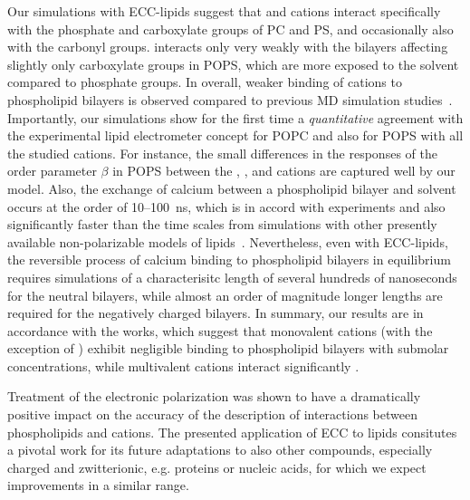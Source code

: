 Our simulations with ECC-lipids suggest that
 and  cations
interact specifically with the phosphate and carboxylate groups of PC and PS, 
and occasionally also with the carbonyl groups. 
 interacts only very weakly with the bilayers
affecting slightly only carboxylate groups in POPS,
which are more exposed to the solvent compared to phosphate groups. 
In overall, weaker binding of cations to phospholipid bilayers is observed 
compared to previous MD simulation studies~\citep{nmrlipids_proj4, catte16, bockmann03, bockmann04, melcrova16, javanainen17}. 
Importantly,
our simulations show for the first time a \emph{quantitative} agreement with the experimental lipid electrometer concept
for POPC and also for POPS with all the studied cations. 
For instance, the small differences 
in the responses of the order parameter $\beta$ in POPS
between the 
, , and  cations
are captured well by our model. 
Also, the exchange of calcium between a phospholipid bilayer and solvent 
occurs at the order of 10--100~ns, 
which is in accord with experiments and also 
significantly faster than the time scales from simulations 
with other presently available non-polarizable models of lipids~\citep{melcrova16, javanainen17, catte16}. 
Nevertheless, even with ECC-lipids,
the reversible process of calcium binding to phospholipid bilayers in equilibrium
requires simulations of a characterisitc length of several hundreds of nanoseconds 
for the neutral bilayers,
while almost an order of magnitude longer lengths 
are required for the negatively charged bilayers. 
In summary,
our results are in accordance with the works,
which suggest that monovalent cations (with the exception of ) 
exhibit negligible binding to phospholipid bilayers with submolar concentrations, 
while multivalent cations interact significantly 
\citep{cevc90,tocanne90, hauser76,hauser78,herbette84,altenbach84,clarke99,binder02,pabst07,uhrikova08,filippov09}.


Treatment  of the electronic polarization 
was shown to have a dramatically positive impact on the accuracy of the description of interactions
between phospholipids and cations. 
The presented application of ECC to lipids
consitutes a pivotal work for its future adaptations 
to also other compounds, especially charged and zwitterionic, 
e.g. proteins or nucleic acids,
for which we expect improvements in a similar range. 

